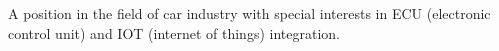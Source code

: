 A position in the field of car industry
with special interests in ECU (electronic control unit)
    and IOT (internet of things) integration.
